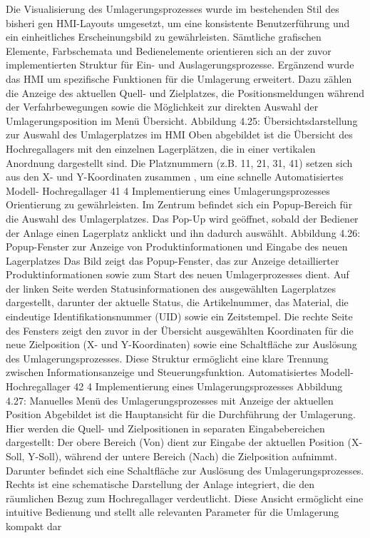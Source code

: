 Die Visualisierung des Umlagerungsprozesses wurde im bestehenden Stil des bisheri
gen HMI-Layouts umgesetzt, um eine konsistente Benutzerführung und ein einheitliches
Erscheinungsbild zu gewährleisten. Sämtliche grafischen Elemente, Farbschemata und
Bedienelemente orientieren sich an der zuvor implementierten Struktur für Ein- und
Auslagerungsprozesse. Ergänzend wurde das HMI um spezifische Funktionen für die
Umlagerung erweitert. Dazu zählen die Anzeige des aktuellen Quell- und Zielplatzes,
die Positionsmeldungen während der Verfahrbewegungen sowie die Möglichkeit zur
direkten Auswahl der Umlagerungsposition im Menü Übersicht.
Abbildung 4.25: Übersichtsdarstellung zur Auswahl des Umlagerplatzes im HMI
Oben abgebildet ist die Übersicht des Hochregallagers mit den einzelnen Lagerplätzen,
die in einer vertikalen Anordnung dargestellt sind. Die Platznummern (z.B. 11, 21,
31, 41) setzen sich aus den X- und Y-Koordinaten zusammen , um eine schnelle
Automatisiertes Modell- Hochregallager
41
4 Implementierung eines Umlagerungsprozesses
Orientierung zu gewährleisten. Im Zentrum befindet sich ein Popup-Bereich für die
Auswahl des Umlagerplatzes. Das Pop-Up wird geöffnet, sobald der Bediener der
Anlage einen Lagerplatz anklickt und ihn dadurch auswählt.
Abbildung 4.26: Popup-Fenster zur Anzeige von Produktinformationen und Eingabe des
neuen Lagerplatzes
Das Bild zeigt das Popup-Fenster, das zur Anzeige detaillierter Produktinformationen
sowie zum Start des neuen Umlagerprozesses dient. Auf der linken Seite werden
Statusinformationen des ausgewählten Lagerplatzes dargestellt, darunter der aktuelle
Status, die Artikelnummer, das Material, die eindeutige Identifikationsnummer (UID)
sowie ein Zeitstempel. Die rechte Seite des Fensters zeigt den zuvor in der Übersicht
ausgewählten Koordinaten für die neue Zielposition (X- und Y-Koordinaten) sowie eine
Schaltfläche zur Auslösung des Umlagerungsprozesses. Diese Struktur ermöglicht eine
klare Trennung zwischen Informationsanzeige und Steuerungsfunktion.
Automatisiertes Modell- Hochregallager
42
4 Implementierung eines Umlagerungsprozesses
Abbildung 4.27: Manuelles Menü des Umlagerungsprozesses mit Anzeige der aktuellen
Position
Abgebildet ist die Hauptansicht für die Durchführung der Umlagerung. Hier werden die
Quell- und Zielpositionen in separaten Eingabebereichen dargestellt: Der obere Bereich
(Von) dient zur Eingabe der aktuellen Position (X-Soll, Y-Soll), während der untere
Bereich (Nach) die Zielposition aufnimmt. Darunter befindet sich eine Schaltfläche zur
Auslösung des Umlagerungsprozesses. Rechts ist eine schematische Darstellung der
Anlage integriert, die den räumlichen Bezug zum Hochregallager verdeutlicht. Diese
Ansicht ermöglicht eine intuitive Bedienung und stellt alle relevanten Parameter für die
Umlagerung kompakt dar

\fi